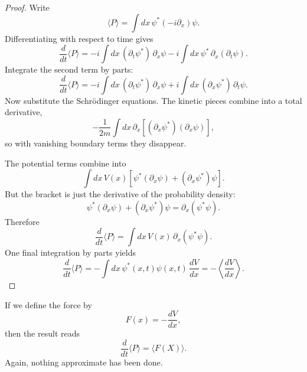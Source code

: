 \begin{proof}
Write
\begin{equation}
\langle P\rangle
=
\int dx\,\psi^*(-i\partial_x)\psi.
\end{equation}
Differentiating with respect to time gives
\begin{equation}
\frac{d}{dt}\langle P\rangle
=
-i\int dx\,(\partial_t\psi^*)\,\partial_x\psi
-i\int dx\,\psi^*\,\partial_x(\partial_t\psi).
\end{equation}
Integrate the second term by parts:
\begin{equation}
\frac{d}{dt}\langle P\rangle
=
-i\int dx\,(\partial_t\psi^*)\,\partial_x\psi
+i\int dx\,(\partial_x\psi^*)\,\partial_t\psi.
\end{equation}
Now substitute the Schr\"odinger equations. The kinetic pieces combine into a total derivative,
\begin{equation}
-\frac{1}{2m}\int dx\,\partial_x\!\left[(\partial_x\psi^*)(\partial_x\psi)\right],
\end{equation}
so with vanishing boundary terms they disappear.

The potential terms combine into
\begin{equation}
\int dx\,V(x)\left[\psi^*(\partial_x\psi)+(\partial_x\psi^*)\psi\right].
\end{equation}
But the bracket is just the derivative of the probability density:
\begin{equation}
\psi^*(\partial_x\psi)+(\partial_x\psi^*)\psi
=
\partial_x(\psi^*\psi).
\end{equation}
Therefore
\begin{equation}
\frac{d}{dt}\langle P\rangle
=
\int dx\,V(x)\,\partial_x(\psi^*\psi).
\end{equation}
One final integration by parts yields
\begin{equation}
\frac{d}{dt}\langle P\rangle
=
-\int dx\,\psi^*(x,t)\psi(x,t)\,\frac{dV}{dx}
=
-\left\langle \frac{dV}{dx}\right\rangle.
\end{equation}
\end{proof}

If we define the force by
\begin{equation}
F(x)=-\frac{dV}{dx},
\end{equation}
then the result reads
\begin{equation}
\frac{d}{dt}\langle P\rangle=\langle F(X)\rangle.
\end{equation}
Again, nothing approximate has been done.

